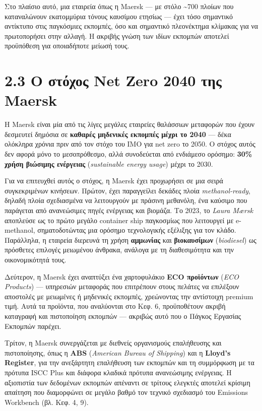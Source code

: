 Στο πλαίσιο αυτό, μια εταιρεία όπως η Maersk --- με στόλο
\textasciitilde700 πλοίων που καταναλώνουν εκατομμύρια τόνους καυσίμου
ετησίως --- έχει τόσο σημαντικό αντίκτυπο στις παγκόσμιες εκπομπές, όσο
και σημαντικό πλεονέκτημα κλίμακας για να πρωτοπορήσει στην αλλαγή. Η
ακριβής γνώση των ιδίων εκπομπών αποτελεί προϋπόθεση για οποιαδήποτε
μείωσή τους.

\section{2.3 Ο στόχος Net Zero 2040 της
Maersk}\label{ux3bf-ux3c3ux3c4ux3ccux3c7ux3bfux3c2-net-zero-2040-ux3c4ux3b7ux3c2-maersk}

Η Maersk είναι μία από τις λίγες μεγάλες εταιρείες θαλάσσιων μεταφορών
που έχουν δεσμευτεί δημόσια σε \textbf{καθαρές μηδενικές εκπομπές μέχρι
το 2040} --- δέκα ολόκληρα χρόνια πριν από τον στόχο του IMO για net
zero το 2050. Ο στόχος αυτός δεν αφορά μόνο το μεσοπρόθεσμο, αλλά
συνοδεύεται από ενδιάμεσο ορόσημο: \textbf{30\% χρήση βιώσιμης
ενέργειας} (\emph{sustainable energy usage}) μέχρι το 2030.

Για να επιτευχθεί αυτός ο στόχος, η Maersk έχει προχωρήσει σε μια σειρά
συγκεκριμένων κινήσεων. Πρώτον, έχει παραγγείλει δεκάδες πλοία
\emph{methanol-ready}, δηλαδή πλοία σχεδιασμένα να λειτουργούν με
πράσινη μεθανόλη, ένα καύσιμο που παράγεται από ανανεώσιμες πηγές
ενέργειας και βιομάζα. Το 2023, το \emph{Laura Mærsk} αποπλεύσε ως το
πρώτο μεγάλο container ship παγκοσμίως που λειτουργεί με e-methanol,
σηματοδοτώντας μια ορόσημο τεχνολογικής εξέλιξης για τον κλάδο.
Παράλληλα, η εταιρεία διερευνά τη χρήση \textbf{αμμωνίας} και
\textbf{βιοκαυσίμων} (\emph{biodiesel}) ως πρόσθετες επιλογές μειωμένου
άνθρακα, ανάλογα με τη διαθεσιμότητα και την οικονομικότητά τους.

Δεύτερον, η Maersk έχει αναπτύξει ένα χαρτοφυλάκιο \textbf{ECO
προϊόντων} (\emph{ECO Products}) --- υπηρεσιών μεταφοράς που επιτρέπουν
στους πελάτες να επιλέξουν αποστολές με μειωμένες ή μηδενικές εκπομπές,
χρεώνοντας την αντίστοιχη premium τιμή. Αυτά τα προϊόντα, που αναλύονται
στο Κεφ. 6, προϋποθέτουν ακριβή καταγραφή και πιστοποίηση εκπομπών ---
ακριβώς αυτό που ο Πάγκος Εργασίας Εκπομπών παρέχει.

Τρίτον, η Maersk συνεργάζεται με διεθνείς οργανισμούς επαλήθευσης και
πιστοποίησης, όπως η \textbf{ABS} (\emph{American Bureau of Shipping})
και η \textbf{Lloyd's Register}, για την ανεξάρτητη επαλήθευση των
εκπομπών και τη συμμόρφωση με τα πρότυπα ISCC Plus και διάφορα κλαδικά
πρότυπα ανανεώσιμης ενέργειας. Η αξιοπιστία των δεδομένων εκπομπών
απέναντι σε τρίτους ελεγκτές αποτελεί κρίσιμη απαίτηση που διαμορφώνει
σε μεγάλο βαθμό τον τεχνικό σχεδιασμό του Emissions Workbench (βλ. Κεφ.
4, 9).

